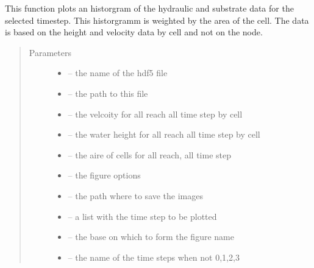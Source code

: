 \documentclass[letterpaper,10pt,english]{sphinxmanual}
\begin{document}
\begin{fulllineitems}
\label{\detokenize{index:src.calcul_hab.plot_hist_hydro}}
This function plots an historgram of the hydraulic and substrate data for the selected timestep. This historgramm
is weighted by the area of the cell. The data is based on the height and velocity data by cell and not on the node.
\begin{quote}\begin{description}
\item[{Parameters}] \leavevmode\begin{itemize}
\item {} 
 -- the name of the hdf5 file

\item {} 
 -- the path to this file

\item {} 
 -- the velcoity for all reach all time step by cell

\item {} 
 -- the water height for all reach all time step by cell

\item {} 
 -- the aire of cells for all reach, all time step

\item {} 
 -- the figure options

\item {} 
 -- the path where to save the images

\item {} 
 -- a list with the time step to be plotted

\item {} 
 -- the base on which to form the figure name

\item {} 
 -- the name of the time steps when not 0,1,2,3

\end{itemize}

\end{description}\end{quote}

\end{fulllineitems}
\end{document}

